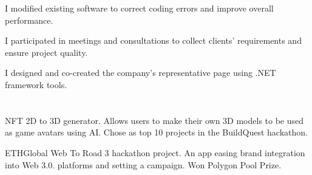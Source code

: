 \documentclass[]{deedy-resume-openfont}
\begin{document}
\begin{minipage}[t]{0.48\textwidth}
\begin{tightemize}
\item I modified existing software to correct coding errors 
\newline
and improve overall performance.
\item I participated in meetings and consultations to collect clients' requirements and ensure project quality.
\item I designed and co-created the company's representative page using .NET framework tools.
\end{tightemize}
\sectionsep




\section{\quad \quad \quad {} }

NFT 2D to 3D generator. Allows users to make their own 3D models to be used as game avatars using AI. Chose as top 10 projects in the BuildQuest hackathon.
\sectionsep


ETHGlobal Web To Road 3 hackathon project. An app easing brand integration into Web 3.0. platforms and setting a campaign. Won Polygon Pool Prize.
\sectionsep


\end{minipage}
\end{document}
